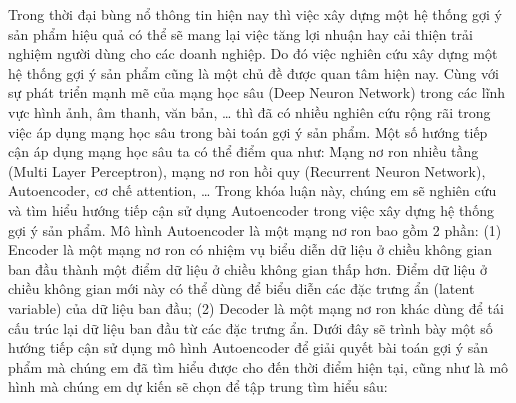 \documentclass{article}[14pt]
\begin{document}
{    Trong thời đại bùng nổ thông tin hiện nay thì việc xây dựng một hệ thống gợi 
    ý sản phẩm hiệu quả có thể sẽ mang lại việc tăng lợi nhuận hay cải thiện trải 
    nghiệm người dùng cho các doanh nghiệp. Do đó việc nghiên cứu xây dựng một hệ 
    thống gợi ý sản phẩm cũng là một chủ đề được quan tâm hiện nay. Cùng với sự 
    phát triển mạnh mẽ của mạng học sâu (Deep Neuron Network) trong các lĩnh vực 
    hình ảnh, âm thanh, văn bản, … thì đã có nhiều nghiên cứu rộng rãi trong việc 
    áp dụng mạng học sâu trong bài toán gợi ý sản phẩm. Một số hướng tiếp cận áp 
    dụng mạng học sâu ta có thể điểm qua như: Mạng nơ ron nhiều tầng (Multi Layer 
    Perceptron), mạng nơ ron hồi quy (Recurrent Neuron Network), Autoencoder, cơ chế attention, … 
    Trong khóa luận này, chúng em sẽ nghiên cứu và tìm hiểu hướng tiếp cận sử 
    dụng Autoencoder trong việc xây dựng hệ thống gợi ý sản phẩm. Mô hình 
    Autoencoder là một mạng nơ ron bao gồm 2 phần: (1) Encoder là một mạng nơ ron 
    có nhiệm vụ biểu diễn dữ liệu ở chiều không gian ban đầu thành một điểm dữ 
    liệu ở chiều không gian thấp hơn. Điểm dữ liệu ở chiều không gian mới này có 
    thể dùng để biểu diễn các đặc trưng ẩn (latent variable) của dữ liệu ban đầu; 
    (2) Decoder là một mạng nơ ron khác dùng để tái cấu trúc lại dữ liệu ban đầu 
    từ các đặc trưng ẩn.
    Dưới đây sẽ trình bày một số hướng tiếp cận sử dụng mô hình Autoencoder để 
    giải quyết bài toán gợi ý sản phẩm mà chúng em đã tìm hiểu được cho đến thời 
    điểm hiện tại, cũng như là mô hình mà chúng em dự kiến sẽ chọn để tập trung 
    tìm hiểu sâu:
    
    
    
}
\end{document}
